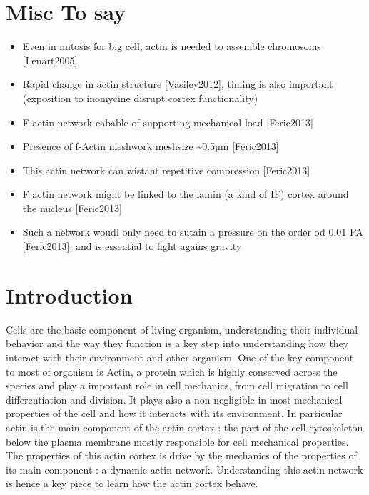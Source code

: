 \documentclass[A4paperpaper,11pt,english]{sphinxmanual}
\begin{document}
\section{Misc To say}
\label{parts/part1:misc-to-say}\begin{itemize}
\item {} 
Even in mitosis for big cell, actin is needed to assemble chromosoms {[}Lenart2005{]}

\item {} 
Rapid change in actin structure {[}Vasilev2012{]}, timing is also important (exposition to inomycine disrupt cortex functionality)

\item {} 
F-actin network cabable of supporting mechanical load {[}Feric2013{]}

\item {} 
Presence of f-Actin meshwork meshsize \textasciitilde{}0.5µm {[}Feric2013{]}

\item {} 
This actin network can wistant repetitive compression {[}Feric2013{]}

\item {} 
F actin network might be linked to the lamin (a kind of IF) cortex around the nucleus {[}Feric2013{]}

\item {} 
Such a network woudl only need to sutain a pressure on the order od 0.01 PA {[}Feric2013{]},
and is essential to fight agains gravity

\end{itemize}


\section{Introduction}
\label{parts/part1:introduction}
Cells are the basic component of living organism, understanding their
individual behavior and the way they function is a key step into understanding
how they interact with their environment and other organism. One of the key
component to most of organism is Actin, a protein which is highly conserved
across the species and play a important role in cell mechanics, from cell
migration to cell differentiation and division. It plays also a non negligible
in most mechanical properties of the cell and how it interacts with its
environment. In particular actin is the main component of the actin cortex :
the part of the cell cytoskeleton below the plasma membrane mostly responsible
for cell mechanical properties. The properties of this actin cortex is drive by
the mechanics of the properties of its main component : a dynamic actin
network. Understanding this actin network is hence a key piece to learn how
the actin cortex behave.
\end{document}
